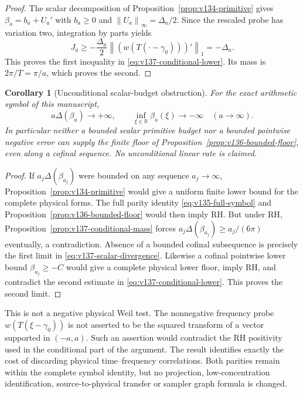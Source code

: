 \documentclass[11pt]{article}
\newtheorem{corollary}[theorem]{Corollary}
\theoremstyle{remark}
\newcommand{\norm}[1]{\left\lVert #1\right\rVert}
\begin{document}
\begin{proof}
The scalar decomposition of Proposition~\ref{prop:v134-primitive}
gives $\beta_a=b_a+U_a'$ with $b_a\ge0$ and
$\norm{U_a}_\infty=\Delta_a/2$. Since the rescaled probe has variation
two, integration by parts yields
\[
 J_a\ge-\frac{\Delta_a}{2}
      \norm{(w(T(\cdot-\gamma_0)))'}_1=-\Delta_a.
\]
This proves the first inequality in \eqref{eq:v137-conditional-lower}.
Its mass is $2\pi/T=\pi/a$, which proves the second.
\end{proof}

\begin{corollary}[Unconditional scalar-budget obstruction]
\label{cor:v137-scalar-no-go}
For the exact arithmetic symbol of this manuscript,
\begin{equation}\label{eq:v137-scalar-divergence}
 a\Delta(\beta_a)\longrightarrow+\infty,
 \qquad
 \inf_{\xi\in\mathbb R}\beta_a(\xi)\longrightarrow-\infty
 \quad(a\longrightarrow\infty).
\end{equation}
In particular neither a bounded scalar primitive budget nor a bounded
pointwise negative error can supply the finite floor of
Proposition~\ref{prop:v136-bounded-floor}, even along a cofinal sequence.
No unconditional linear rate is claimed.
\end{corollary}
\begin{proof}
If $a_j\Delta(\beta_{a_j})$ were bounded on any sequence
$a_j\to\infty$, Proposition~\ref{prop:v134-primitive} would give a
uniform finite lower bound for the complete physical forms. The full
parity identity \eqref{eq:v135-full-symbol} and
Proposition~\ref{prop:v136-bounded-floor} would then imply RH.
But under RH, Proposition~\ref{prop:v137-conditional-mass} forces
$a_j\Delta(\beta_{a_j})\ge a_j/(6\pi)$ eventually, a contradiction.
Absence of a bounded cofinal subsequence is precisely the first limit
in \eqref{eq:v137-scalar-divergence}.
Likewise a cofinal pointwise lower bound $\beta_{a_j}\ge-C$ would
give a complete physical lower floor, imply RH, and contradict the
second estimate in \eqref{eq:v137-conditional-lower}.
This proves the second limit.
\end{proof}

This is not a negative physical Weil test. The nonnegative frequency
probe $w(T(\xi-\gamma_0))$ is not asserted to be the squared transform
of a vector supported in $(-a,a)$. Such an assertion would contradict
the RH positivity used in the conditional part of the argument.
The result identifies exactly the cost of discarding physical
time--frequency correlations. Both parities remain within the complete
symbol identity, but no projection, low-concentration identification,
source-to-physical transfer or sampler graph formula is changed.
\end{document}
